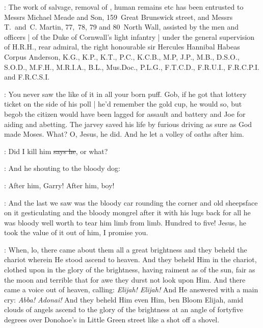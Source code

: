 :
The work of salvage,
removal of ,
human remains etc has been entrusted to Messrs Michael Meade and Son,
159~Great Brunswick street,
and Messrs T.~and~C. Martin,
77,~78, 79 and 80~North Wall,
assisted by the men and officers |
of the Duke of Cornwall's light infantry |
under the general supervision of H.R.H.,
rear admiral,
the right honourable sir Hercules Hannibal Habeas Corpus Anderson,
K.G.,
K.P.,
K.T.,
P.C.,
K.C.B.,
M.P,
J.P.,
M.B.,
D.S.O.,
S.O.D.,
M.F.H.,
M.R.I.A.,
B.L.,
Mus.Doc.,
P.L.G.,
F.T.C.D.,
F.R.U.I.,
F.R.C.P.I.
and F.R.C.S.I.

\Nq:
You never saw the like of it in all your born puff.
Gob,
if he got that lottery ticket on the side of his poll |
he'd remember the gold cup,
he would so,
but begob the citizen would have been lagged for assault
and battery and Joe for aiding and abetting.
The jarvey saved his life
by furious driving as sure as God made Moses.
What?
O, Jesus,
he did.
And he let a volley of oaths after him.

\citizen:
Did I kill him
\sout{says he},
or what?

\Nq:
And he shouting to the bloody dog:

\citizen:
After him,
Garry!
After him,
boy!

\Nq:
And the last we saw was the bloody car rounding the corner and old
sheepsface on it gesticulating and the bloody mongrel after it with his
lugs back for all he was bloody well worth to tear him limb from limb.
Hundred to five!
Jesus,
he took the value of it out of him,
I promise you.

:
When,
lo,
there came about them all a great brightness and they
beheld the chariot wherein He stood ascend to heaven.
And they beheld
Him in the chariot,
clothed upon in the glory of the brightness,
having raiment as of the sun,
fair as the moon and terrible that for awe they
durst not look upon Him.
And there came a voice out of heaven,
calling:
\emph{Elijah!
Elijah!}
And He answered with a main cry:
\emph{Abba!
Adonai!}
And they beheld Him even Him,
ben Bloom Elijah,
amid clouds of angels ascend
to the glory of the brightness at an angle of fortyfive degrees over
Donohoe's in Little Green street like a shot off a shovel.
